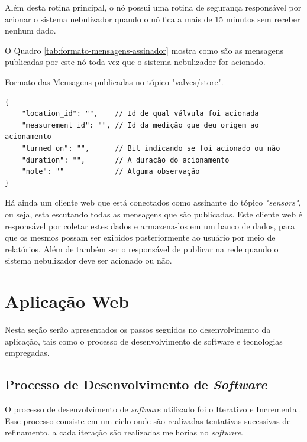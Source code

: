 Além desta rotina principal, o nó possui uma rotina de segurança responsável por acionar o sistema nebulizador quando o nó fica a mais de 15 minutos sem receber nenhum dado.

O Quadro \ref{tab:formato-mensagens-assinador} mostra como são as mensagens publicadas por este nó toda vez que o sistema nebulizador for acionado.

\begin{quadro}[H]
\centering
\caption{Formato das Mensagens publicadas no tópico "valves/store".}
\vspace{-\baselineskip}
\begin{verbatim}
{
    "location_id": "",    // Id de qual válvula foi acionada
    "measurement_id": "", // Id da medição que deu origem ao acionamento
    "turned_on": "",      // Bit indicando se foi acionado ou não
    "duration": "",       // A duração do acionamento
    "note": ""            // Alguma observação
}
\end{verbatim}
\label{tab:formato-mensagens-assinador}
\vspace{-1.2cm}
\end{quadro}

Há ainda um cliente web que está conectados como assinante do tópico \textit{"sensors"}, ou seja, esta escutando todas as mensagens que são publicadas. Este cliente web é responsável por coletar estes dados e armazena-los em um banco de dados, para que os mesmos possam ser exibidos posteriormente ao usuário por meio de relatórios. Além de também ser o responsável de publicar na rede quando o sistema nebulizador deve ser acionado ou não.


\section{Aplicação Web}
Nesta seção serão apresentados os passos seguidos no desenvolvimento da aplicação, tais como o processo de desenvolvimento de software e tecnologias empregadas.

\subsection{Processo de Desenvolvimento de \textit{Software}} 
O processo de desenvolvimento de \textit{software} utilizado foi o Iterativo e Incremental. Esse processo consiste em um ciclo onde são realizadas tentativas sucessivas de refinamento, a cada iteração são realizadas melhorias no \textit{software}.

